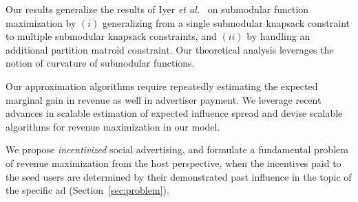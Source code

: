 

Our results generalize the results of Iyer \emph{et al.}~\cite{iyer2013submodular, iyer2015submodularthesis} on submodular function maximization by $(i)$ generalizing from
a single submodular knapsack constraint to multiple submodular knapsack constraints, and $(ii)$ by handling an additional partition matroid constraint.
Our theoretical analysis leverages the notion of curvature of submodular functions.
%


Our approximation algorithms require repeatedly estimating the expected marginal gain in revenue as well in advertiser payment.
We leverage recent advances in scalable estimation of expected influence spread and devise scalable algorithms for revenue maximization in our model.

\enlargethispage{\baselineskip}
\squishlist
\item We propose \emph{incentivized} social advertising, and formulate a fundamental problem of revenue maximization from the host perspective, when the incentives paid to the seed users are determined by their demonstrated past influence in the topic of the specific ad (Section~\ref{sec:problem}).

